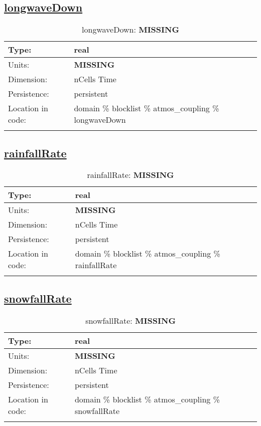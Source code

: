 \subsection[longwaveDown]{\hyperref[sec:var_tab_atmos_coupling]{longwaveDown}}
\label{subsec:var_sec_atmos_coupling_longwaveDown}
\begin{center}
\begin{longtable}{| p{2.0in} | p{4.0in} |}
        \hline 
        Type: & real \\
        \hline 
        Units: & {\bf \color{red} MISSING} \\
        \hline 
        Dimension: & nCells Time \\
        \hline 
        Persistence: & persistent \\
        \hline 
         Location in code: & domain \% blocklist \% atmos\_coupling \% longwaveDown \\
         \hline 
    \caption{longwaveDown: {\bf \color{red} MISSING}}
\end{longtable}
\end{center}
\subsection[rainfallRate]{\hyperref[sec:var_tab_atmos_coupling]{rainfallRate}}
\label{subsec:var_sec_atmos_coupling_rainfallRate}
\begin{center}
\begin{longtable}{| p{2.0in} | p{4.0in} |}
        \hline 
        Type: & real \\
        \hline 
        Units: & {\bf \color{red} MISSING} \\
        \hline 
        Dimension: & nCells Time \\
        \hline 
        Persistence: & persistent \\
        \hline 
         Location in code: & domain \% blocklist \% atmos\_coupling \% rainfallRate \\
         \hline 
    \caption{rainfallRate: {\bf \color{red} MISSING}}
\end{longtable}
\end{center}
\subsection[snowfallRate]{\hyperref[sec:var_tab_atmos_coupling]{snowfallRate}}
\label{subsec:var_sec_atmos_coupling_snowfallRate}
\begin{center}
\begin{longtable}{| p{2.0in} | p{4.0in} |}
        \hline 
        Type: & real \\
        \hline 
        Units: & {\bf \color{red} MISSING} \\
        \hline 
        Dimension: & nCells Time \\
        \hline 
        Persistence: & persistent \\
        \hline 
         Location in code: & domain \% blocklist \% atmos\_coupling \% snowfallRate \\
         \hline 
    \caption{snowfallRate: {\bf \color{red} MISSING}}
\end{longtable}
\end{center}
